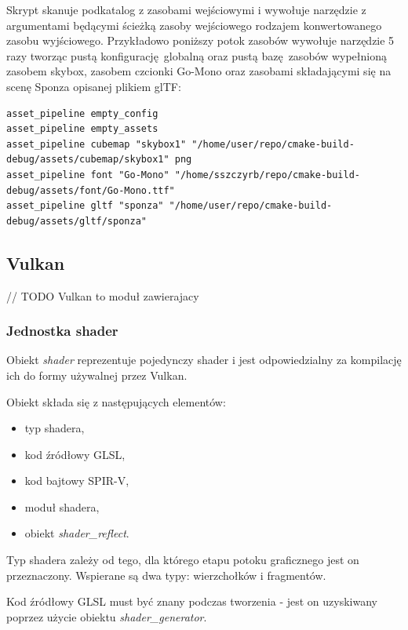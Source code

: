 Skrypt skanuje podkatalog z zasobami wejściowymi i wywołuje narzędzie z argumentami będącymi ścieżką zasoby wejściowego rodzajem konwertowanego zasobu wyjściowego.
Przykładowo poniższy potok zasobów wywołuje narzędzie 5 razy tworząc pustą konfigurację globalną oraz pustą bazę zasobów wypełnioną zasobem skybox, zasobem czcionki Go-Mono oraz zasobami składającymi się na scenę Sponza opisanej plikiem glTF:
\lstset{language=verbatim}
\begin{lstlisting}[caption={Komeny wywoływane przez przykładowy potok zasobów},captionpos=b]
asset_pipeline empty_config
asset_pipeline empty_assets
asset_pipeline cubemap "skybox1" "/home/user/repo/cmake-build-debug/assets/cubemap/skybox1" png
asset_pipeline font "Go-Mono" "/home/sszczyrb/repo/cmake-build-debug/assets/font/Go-Mono.ttf"
asset_pipeline gltf "sponza" "/home/user/repo/cmake-build-debug/assets/gltf/sponza"
\end{lstlisting}

\subsection{Vulkan}

// TODO Vulkan to moduł zawierajacy 

\subsubsection{Jednostka shader}
Obiekt \textit{shader} reprezentuje pojedynczy shader i jest odpowiedzialny za kompilację ich do formy używalnej przez Vulkan.

Obiekt składa się z następujących elementów:
\begin{itemize}
	\item typ shadera,
	\item kod źródłowy GLSL,
	\item kod bajtowy SPIR-V,
	\item moduł shadera,
	\item obiekt \textit{shader\_reflect}.
\end{itemize}

Typ shadera zależy od tego, dla którego etapu potoku graficznego jest on przeznaczony.
Wspierane są dwa typy: wierzchołków i fragmentów.

Kod źródłowy GLSL must być znany podczas tworzenia - jest on uzyskiwany poprzez użycie obiektu \textit{shader\_generator}.

